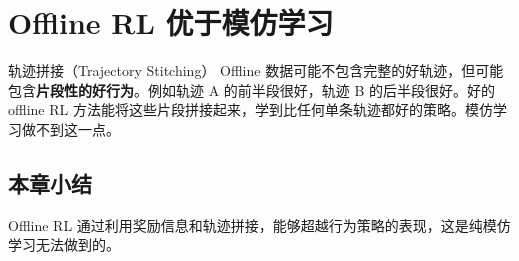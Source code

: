 \section{Offline RL 优于模仿学习}

\begin{importantbox}{轨迹拼接（Trajectory Stitching）}
Offline 数据可能不包含完整的好轨迹，但可能包含\textbf{片段性的好行为}。例如轨迹 A 的前半段很好，轨迹 B 的后半段很好。好的 offline RL 方法能将这些片段拼接起来，学到比任何单条轨迹都好的策略。模仿学习做不到这一点。
\end{importantbox}

\subsection{本章小结}

Offline RL 通过利用奖励信息和轨迹拼接，能够超越行为策略的表现，这是纯模仿学习无法做到的。

